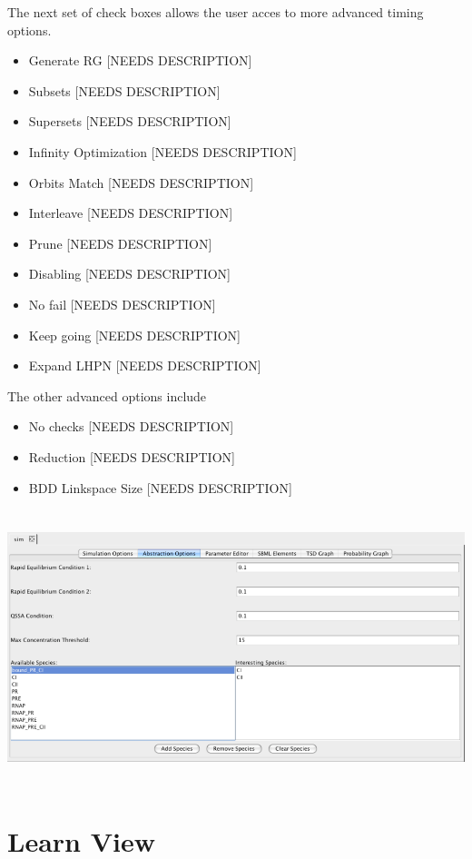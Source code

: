 \documentclass[titlepage,11pt]{article}
\begin{document}
The next set of check boxes allows the user acces to more advanced timing
options.
\begin{itemize}
\item Generate RG [NEEDS DESCRIPTION]
\item Subsets [NEEDS DESCRIPTION]
\item Supersets [NEEDS DESCRIPTION]
\item Infinity Optimization [NEEDS DESCRIPTION]
\item Orbits Match [NEEDS DESCRIPTION]
\item Interleave [NEEDS DESCRIPTION]
\item Prune [NEEDS DESCRIPTION]
\item Disabling [NEEDS DESCRIPTION]
\item No fail [NEEDS DESCRIPTION]
\item Keep going [NEEDS DESCRIPTION]
\item Expand LHPN [NEEDS DESCRIPTION]
\end{itemize}

The other advanced options include
\begin{itemize}
\item No checks [NEEDS DESCRIPTION]
\item Reduction [NEEDS DESCRIPTION]
\item BDD Linkspace Size [NEEDS DESCRIPTION]
\end{itemize}
\begin{center}
\includegraphics[height=80mm]{screenshots/absOptions}
\end{center}

\section{\label{Learn}Learn View}
\end{document}
